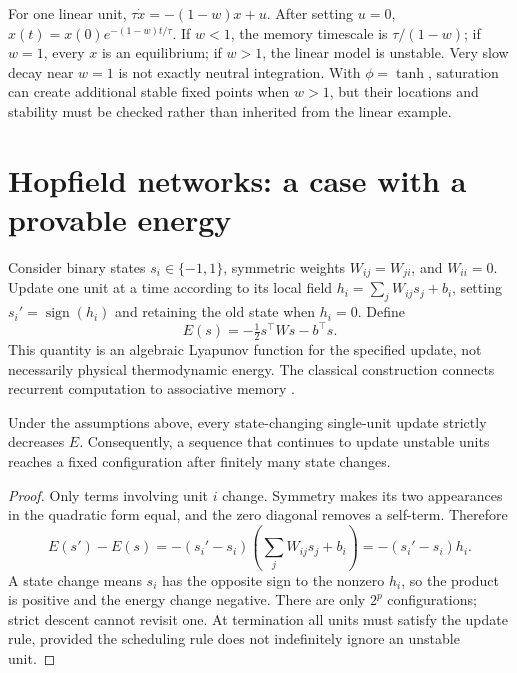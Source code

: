 \begin{example}
For one linear unit, $\tau\dot x=-(1-w)x+u$. After setting $u=0$, $x(t)=x(0)e^{-(1-w)t/\tau}$. If $w<1$, the memory timescale is $\tau/(1-w)$; if $w=1$, every $x$ is an equilibrium; if $w>1$, the linear model is unstable. Very slow decay near $w=1$ is not exactly neutral integration. With $\phi=\tanh$, saturation can create additional stable fixed points when $w>1$, but their locations and stability must be checked rather than inherited from the linear example.
\end{example}

\section{Hopfield networks: a case with a provable energy}
\label{sec:07-hopfield}
Consider binary states $s_i\in\{-1,1\}$, symmetric weights $W_{ij}=W_{ji}$, and $W_{ii}=0$. Update one unit at a time according to its local field $h_i=\sum_jW_{ij}s_j+b_i$, setting $s_i'=\operatorname{sign}(h_i)$ and retaining the old state when $h_i=0$. Define
\begin{equation}
 E(s)=-\tfrac12s^\top Ws-b^\top s.\label{eq:07-hopfield-energy}
\end{equation}
This quantity is an algebraic Lyapunov function for the specified update, not necessarily physical thermodynamic energy. The classical construction connects recurrent computation to associative memory \citep{app_hopfield1982}.

\begin{proposition}
Under the assumptions above, every state-changing single-unit update strictly decreases $E$. Consequently, a sequence that continues to update unstable units reaches a fixed configuration after finitely many state changes.
\end{proposition}
\begin{proof}
Only terms involving unit $i$ change. Symmetry makes its two appearances in the quadratic form equal, and the zero diagonal removes a self-term. Therefore
\[
 E(s')-E(s)=-(s_i'-s_i)\left(\sum_jW_{ij}s_j+b_i\right)
          =-(s_i'-s_i)h_i.
\]
A state change means $s_i$ has the opposite sign to the nonzero $h_i$, so the product is positive and the energy change negative. There are only $2^p$ configurations; strict descent cannot revisit one. At termination all units must satisfy the update rule, provided the scheduling rule does not indefinitely ignore an unstable unit.
\end{proof}

